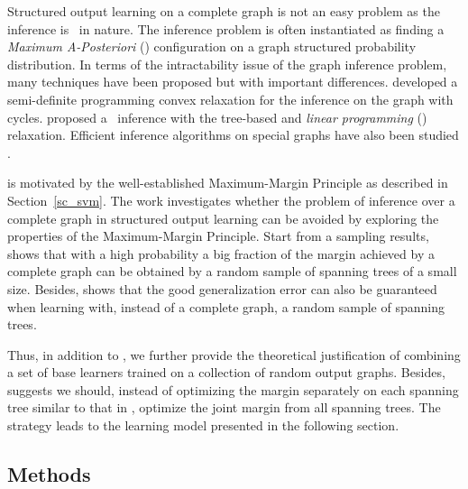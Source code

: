 {Structured output learning on a complete graph is not an easy problem as the inference is \nphard\ in nature.
The inference problem is often instantiated as finding a \textit{Maximum A-Posteriori} (\map) configuration on a graph structured probability distribution.
In terms of the intractability issue of the graph inference problem, many techniques have been proposed but with important differences.
\citet{Jordan04semiefinite} developed a semi-definite programming convex relaxation for the inference on the graph with cycles.
\citet{Wainwright05map} proposed a \map\ inference with the tree-based and \textit{linear programming} (\lp) relaxation.
Efficient inference algorithms on special graphs have also been studied \citep{Globerson07approximate}.

 is motivated by the well-established Maximum-Margin Principle as described in Section~\ref{sc_svm}.
The work investigates whether the problem of inference over a complete graph in structured output learning can be avoided by exploring the properties of the Maximum-Margin Principle.
Start from a sampling results,  shows that with a high probability a big fraction of the margin achieved by a complete graph can be obtained by a random sample of spanning trees of a small size.
Besides,  shows that the good generalization error can also be guaranteed when learning with, instead of a complete graph, a random sample of spanning trees.

Thus, in addition to , we further provide the theoretical justification of combining a set of base learners trained on a collection of random output graphs. 
Besides,  suggests we should, instead of optimizing the margin separately on each spanning tree similar to that in \mam, optimize the joint margin from all spanning trees.
The strategy leads to the learning model presented in the following section.

\subsection{Methods}

}
